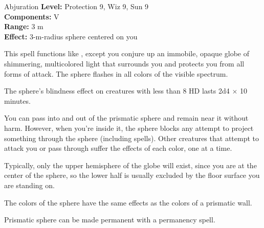 {Abjuration}
{
	\textbf{Level:}
	Protection 9, Wiz 9, Sun 9\\
	\textbf{Components:}
	V\\
	\textbf{Range:}
	3 m\\
	\textbf{Effect:}
	3-m-radius sphere centered on you\\
}
{
	This spell functions like , except you conjure up an immobile, opaque globe of shimmering, multicolored light that surrounds you and protects you from all forms of attack. The sphere flashes in all colors of the visible spectrum.

	The sphere's blindness effect on creatures with less than 8 HD lasts 2d4 $\times$ 10 minutes.

	You can pass into and out of the prismatic sphere and remain near it without harm. However, when you're inside it, the sphere blocks any attempt to project something through the sphere (including spells). Other creatures that attempt to attack you or pass through suffer the effects of each color, one at a time.

	Typically, only the upper hemisphere of the globe will exist, since you are at the center of the sphere, so the lower half is usually excluded by the floor surface you are standing on.

	The colors of the sphere have the same effects as the colors of a prismatic wall.

	Prismatic sphere can be made permanent with a permanency spell.

}

